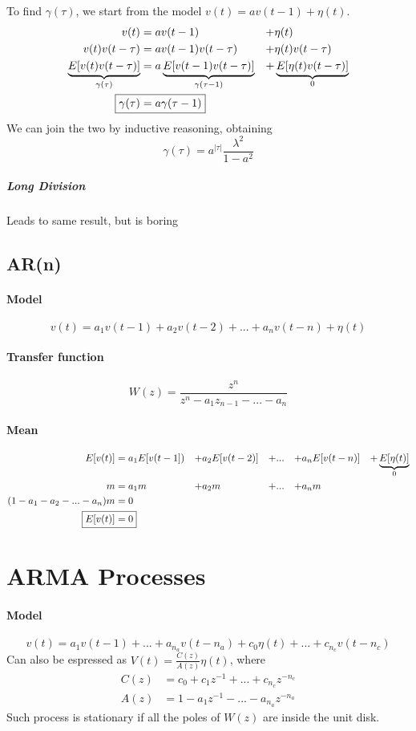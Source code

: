 \documentclass{report}
\begin{document}
To find $\gamma(\tau)$, we start from the model $v(t)=av(t-1)+\eta(t)$.
\begin{alignat*}{4}
v(t)&=av(t-1)&+&\eta(t)\\
v(t)v(t-\tau)&=av(t-1)v(t-\tau)&+&\eta(t)v(t-\tau)\\
\underbrace{E[v(t)v(t-\tau)]}_{\gamma(\tau)}&=
	a\underbrace{E[v(t-1)v(t-\tau)]}_{\gamma(\tau-1)}&+&
	\underbrace{E[\eta(t)v(t-\tau)]}_0\\
\Aboxed{
\gamma(\tau)&=a\gamma(\tau-1)
}
\end{alignat*}
We can join the two by inductive reasoning, obtaining
\[\boxed{
\gamma(\tau)=a^{|\tau|}\frac{\lambda^2}{1-a^2}
}\]
\subparagraph{Long Division} Leads to same result, but is boring

\subsection{AR(n)}
\paragraph{Model}
\[
v(t)=a_1v(t-1)+a_2v(t-2)+...+a_nv(t-n)+\eta(t)
\]
\paragraph{Transfer function}
\[
W(z)=\frac{z^n}{z^n-a_1z_{n-1}-...-a_n}
\]
\paragraph{Mean}
\begin{alignat*}{6}
E[v(t)]	&=	a_1E[v(t-1])	&+&a_2E[v(t-2)]	&+&...	&+&a_nE[v(t-n)]	&+&\underbrace{E[\eta(t)]}_0\\
m		&=	a_1m			&+&a_2m			&+&...	&+&a_nm\\
(1-a_1-a_2-...-a_n)m&=0\\
\Aboxed{
E[v(t)]&=0
}
\end{alignat*}
\section{ARMA Processes}
\paragraph{Model}
\[
v(t)=
	a_1v(t-1)+...+a_{n_a}v(t-n_a)+
	c_0\eta(t)+...+c_{n_c}v(t-n_c)
\]
Can also be espressed as $V(t)=\frac{C(z)}{A(z)}\eta(t)$, where
\begin{align*}
C(z)&=c_0+c_1z^{-1}+...+c_{n_c}z^{-n_c}\\
A(z)&=1-a_1z^{-1}-...-a_{n_a}z^{-n_a}
\end{align*}
Such process is stationary if all the poles of $W(z)$ are inside the unit disk.
\end{document}
